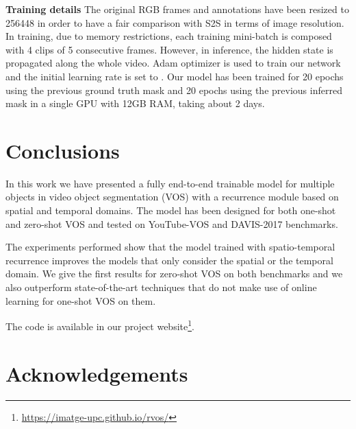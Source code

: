 \documentclass[10pt,twocolumn,letterpaper]{article}
\begin{document}
\textbf{Training details} The original RGB frames and annotations have been resized to 256448 in order to have a fair comparison with S2S \cite{xu2018youtube} in terms of image resolution. In training, due to memory restrictions, each training mini-batch is composed with 4 clips of 5 consecutive frames. However, in inference, the hidden state is propagated along the whole video. Adam optimizer is used to train our network and the initial learning rate is set to . Our model has been trained for 20 epochs using the previous ground truth mask and 20 epochs using the previous inferred mask in a single GPU with 12GB RAM, taking about 2 days.
 \section{Conclusions}

In this work we have presented a fully end-to-end trainable model for multiple objects in video object segmentation (VOS) with a recurrence module based on spatial and temporal domains. The model has been designed for both one-shot and zero-shot VOS and tested on YouTube-VOS and DAVIS-2017 benchmarks. 

The experiments performed show that the model trained with spatio-temporal recurrence improves the models that only consider the spatial or the temporal domain. We give the first results for zero-shot VOS on both benchmarks and we also outperform state-of-the-art techniques that do not make use of online learning for one-shot VOS on them. 

The code is available in our project website\footnote{{\href{https://imatge-upc.github.io/rvos/}{https://imatge-upc.github.io/rvos/}}}.
\label{sec:conclusion} \section*{Acknowledgements}
\end{document}
